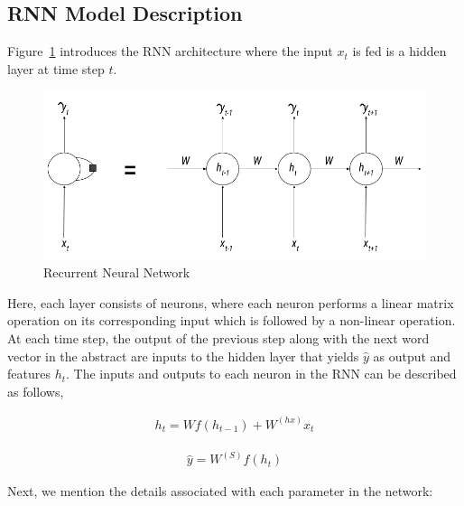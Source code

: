 \subsection{RNN Model Description}
Figure~\ref{fig:rnnarch} introduces the RNN architecture where the input $x_t$ is fed is a hidden layer at time step $t$. 
\begin{figure}
    \centering
    \includegraphics[scale=0.5]{Figures/rnn_figure_1.png}
    \caption{Recurrent Neural Network}
    \label{fig:rnnarch}
\end{figure}
Here, each layer consists of neurons, where each neuron performs a linear matrix operation on its corresponding input which is followed by a non-linear operation. At each time step, the output of the previous step along with the next word vector in the abstract are inputs to the hidden layer that yields $\widehat{y}$ as output and features $h_t$. The inputs and outputs to each neuron in the RNN can be described as follows,

\begin{equation}
\begin{aligned}
	h_t = W f(h_{t-1}) + W^{(hx)}x_t
\end{aligned}
\end{equation}

\begin{equation}
\begin{aligned}
	\widehat{y} = W^{(S)}f(h_{t})
\end{aligned}
\end{equation}

Next, we mention the details associated with each parameter in the network:

